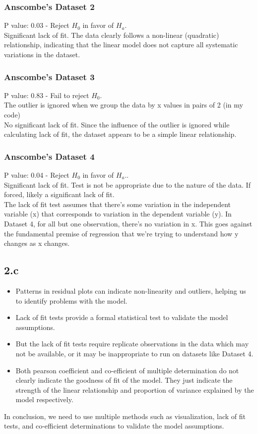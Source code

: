 \documentclass[12pt]{article}
\begin{document}
\subsubsection*{Anscombe's Dataset 2}
P value: 0.03 - Reject \(H_0\) in favor of \(H_a\).
\\
Significant lack of fit. The data clearly follows a non-linear (quadratic)
relationship, indicating that the linear model does not capture all systematic
variations in the dataset.

\subsubsection*{Anscombe's Dataset 3}
P value: 0.83 - Fail to reject \(H_0\).
\\
The outlier is ignored when we group the data by x values in pairs of 2
(in my code)
\\
No significant lack of fit. Since the influence of the outlier is ignored while
calculating lack of fit, the dataset appears to be a simple linear relationship.

\subsubsection*{Anscombe's Dataset 4}
P value: 0.04 - Reject \(H_0\) in favor of \(H_a\)..
\\
Significant lack of fit. Test is not be appropriate due to the nature of the data.
If forced, likely a significant lack of fit.
\\[\baselineskip]
The lack of fit test assumes that there's some variation in the independent variable (x)
that corresponds to variation in the dependent variable (y).
In Dataset 4, for all but one observation, there's no variation in x.
This goes against the fundamental premise of regression that
we're trying to understand how y changes as x changes.

\newpage
\subsection*{2.c}
\begin{itemize}
    \item Patterns in residual plots can indicate non-linearity and outliers,
    helping us to identify problems with the model.
    \item Lack of fit tests provide a formal statistical test to validate
    the model assumptions.
    \item But the lack of fit tests require replicate observations in the data
    which may not be available, or it may be inappropriate to run on datasets
    like Dataset 4.
    \item Both pearson coefficient and co-efficient of multiple determination
    do not clearly indicate the goodness of fit of the model. They just indicate
    the strength of the linear relationship and proportion of variance explained
    by the model respectively.
\end{itemize}
In conclusion, we need to use multiple methods such as visualization, lack of fit
tests, and co-efficient determinations to validate the model assumptions.
\end{document}
